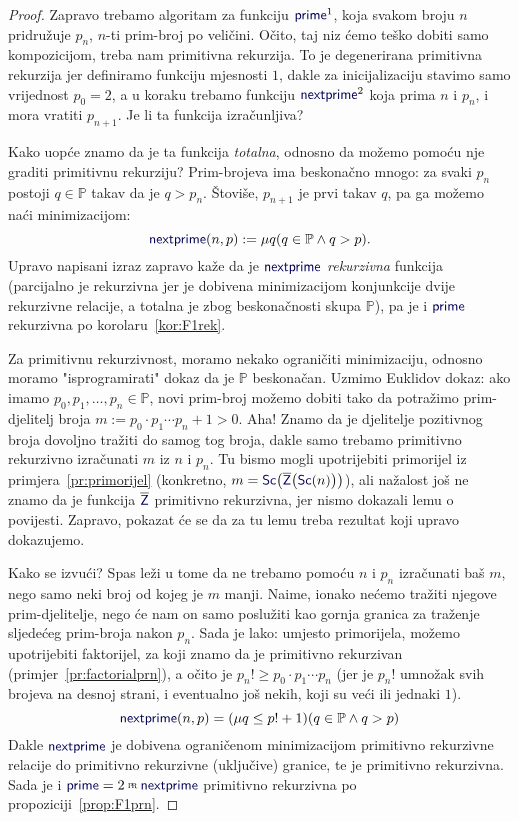 \begin{proof}
Zapravo trebamo algoritam za funkciju $\f{prime}^1$, koja svakom broju $n$ pridružuje $p_n$, $n$-ti prim-broj po veličini. Očito, taj niz ćemo teško dobiti samo kompozicijom, treba nam primitivna rekurzija. To je degenerirana primitivna rekurzija jer definiramo funkciju mjesnosti $1$, dakle za inicijalizaciju stavimo samo vrijednost $p_0=2$, a u koraku trebamo funkciju $\f{nextprime}^2$ koja prima $n$ i $p_n$, i mora vratiti $p_{n+1}$. Je li ta funkcija izračunljiva?

Kako uopće znamo da je ta funkcija \emph{totalna}, odnosno da možemo pomoću nje graditi primitivnu rekurziju? Prim-brojeva ima beskonačno mnogo: za svaki $p_n$ postoji $q\in\mathbb P$ takav da je $q>p_n$. Štoviše, $p_{n+1}$ je prvi takav $q$, pa ga možemo naći minimizacijom:
\begin{equation}\label{eq:primerek}
    \f{nextprime}(n,p):=\mu q(q\in\mathbb P\land q>p)\text.
\end{equation}
Upravo napisani izraz zapravo kaže da je $\f{nextprime}$ \emph{rekurzivna} funkcija (parcijalno je rekurzivna jer je dobivena minimizacijom konjunkcije dvije rekurzivne relacije, a totalna je zbog beskonačnosti skupa $\mathbb P$), pa je i $\f{prime}$ rekurzivna po korolaru~\ref{kor:F1rek}.

Za primitivnu rekurzivnost, moramo nekako ograničiti minimizaciju, odnosno moramo "isprogramirati" dokaz da je $\mathbb P$ beskonačan. Uzmimo Euklidov dokaz: ako imamo $p_0,p_1,\dotsc,p_n\in\mathbb P$, novi prim-broj možemo dobiti tako da potražimo prim-djelitelj broja $m:=p_0\cdot p_1\dotsm p_n+1>0$. Aha! Znamo da je djelitelje pozitivnog broja dovoljno tražiti do samog tog broja, dakle samo trebamo primitivno rekurzivno izračunati $m$ iz $n$ i $p_n$. Tu bismo mogli upotrijebiti primorijel iz primjera~\ref{pr:primorijel} (konkretno, $m=\f{Sc}\bigl(\overline{\f Z}\bigl(\f{Sc}(n)\bigr)\bigr)$), ali nažalost još ne znamo da je funkcija $\overline{\f Z}$ primitivno rekurzivna, jer nismo dokazali lemu o povijesti. Zapravo, pokazat će se da za tu lemu treba rezultat koji upravo dokazujemo.

Kako se izvući? Spas leži u tome da ne trebamo pomoću $n$ i $p_n$ izračunati baš $m$, nego samo neki broj od kojeg je $m$ manji. Naime, ionako nećemo tražiti njegove prim-djelitelje, nego će nam on samo poslužiti kao gornja granica za traženje sljedećeg prim-broja nakon $p_n$. Sada je lako: umjesto primorijela, možemo upotrijebiti faktorijel, za koji znamo da je primitivno rekurzivan (primjer~\ref{pr:factorialprn}), a očito je $p_n!\ge p_0\cdot p_1\dotsm p_n$ (jer je $p_n!$ umnožak svih brojeva na desnoj strani, i eventualno još nekih, koji su veći ili jednaki $1$).
\begin{equation}
    \f{nextprime}(n,p)=(\mu q\le p!+1)(q\in\mathbb P\land q>p)%
\end{equation}
Dakle $\f{nextprime}$ je dobivena ograničenom minimizacijom primitivno rekurzivne relacije do primitivno rekurzivne (uključive) granice, te je primitivno rekurzivna. Sada je i $\f{prime}=2\pr\f{nextprime}$ primitivno rekurzivna po propoziciji~\ref{prop:F1prn}.
\end{proof}

